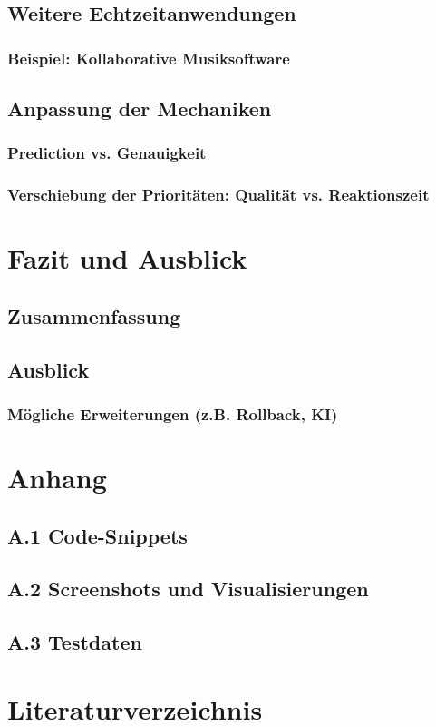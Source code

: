 \documentclass[12pt,a4paper]{article}
\begin{document}
\subsection{Weitere Echtzeitanwendungen}
\subsubsection{Beispiel: Kollaborative Musiksoftware}
\subsection{Anpassung der Mechaniken}
\subsubsection{Prediction vs. Genauigkeit}
\subsubsection{Verschiebung der Prioritäten: Qualität vs. Reaktionszeit}

\clearpage

\section{Fazit und Ausblick}
\subsection{Zusammenfassung}
\subsection{Ausblick}
\subsubsection{Mögliche Erweiterungen (z.B. Rollback, KI)}

\clearpage

\appendix
\section*{Anhang}
\subsection*{A.1 Code-Snippets}
\subsection*{A.2 Screenshots und Visualisierungen}
\subsection*{A.3 Testdaten}

\section*{Literaturverzeichnis}
\end{document}
